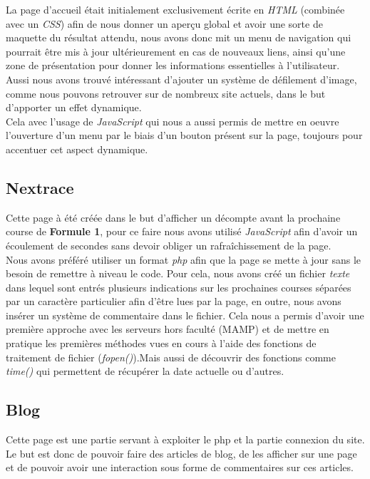 \documentclass{article}
\begin{document}
La page d'accueil était initialement exclusivement écrite en \emph{HTML} (combinée avec un \emph{CSS}) afin de nous donner un aperçu global et avoir une sorte de maquette du résultat attendu, nous avons donc mit un menu de navigation qui pourrait être mis à jour ultérieurement en cas de nouveaux liens, ainsi qu'une zone de présentation pour donner les informations essentielles à l'utilisateur.\\

Aussi nous avons trouvé intéressant d'ajouter un système de défilement d'image, comme nous pouvons retrouver sur de nombreux site actuels, dans le but d'apporter un effet dynamique.\\
Cela avec l'usage de \emph{JavaScript} qui nous a aussi permis de mettre en oeuvre l'ouverture d'un menu par le biais d'un bouton présent sur la page, toujours pour accentuer cet aspect dynamique.

\subsection{Nextrace}

Cette page à été créée dans le but d'afficher un décompte avant la prochaine course de \textbf{Formule 1}, pour ce faire nous avons utilisé \emph{JavaScript} afin d'avoir un écoulement de secondes sans devoir obliger un rafraîchissement de la page.\\

Nous avons préféré utiliser un format \emph{php} afin que la page se mette à jour sans le besoin de remettre à niveau le code. Pour cela, nous avons créé un fichier \emph{texte} dans lequel sont entrés plusieurs indications sur les prochaines courses séparées par un caractère particulier afin d'être lues par la page, en outre, nous avons insérer un système de commentaire dans le fichier. Cela nous a permis d'avoir une première approche avec les serveurs hors faculté (MAMP) et de mettre en pratique les premières méthodes vues en cours à l'aide des fonctions de traitement de fichier (\emph{fopen()}).Mais aussi de découvrir des fonctions comme \emph{time()} qui permettent de récupérer la date actuelle ou d'autres.

\subsection{Blog}

Cette page est une partie servant à exploiter le php et la partie connexion du site.
Le but est donc de pouvoir faire des articles de blog, de les afficher sur une page et de pouvoir avoir une interaction sous forme de commentaires sur ces articles.\\
\end{document}
